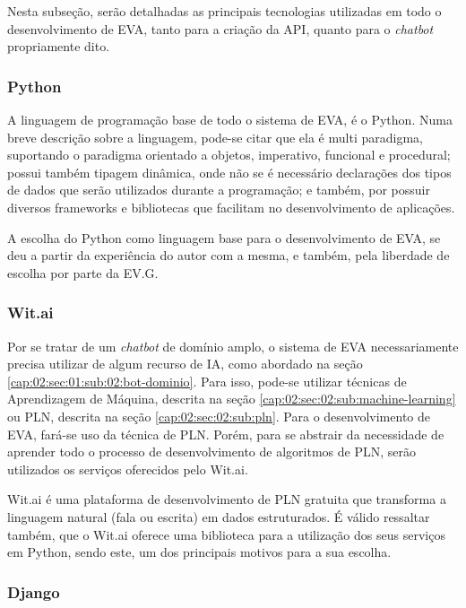 Nesta subseção, serão detalhadas as principais tecnologias utilizadas em todo o desenvolvimento de EVA, tanto para a criação da API, quanto para o \textit{chatbot} propriamente dito.

\subsubsection{Python}

A linguagem de programação base de todo o sistema de EVA, é o Python. Numa breve descrição sobre a linguagem, pode-se citar que ela é multi paradigma, suportando o paradigma orientado a objetos, imperativo, funcional e procedural; possui também tipagem dinâmica, onde não se é necessário declarações dos tipos de dados que serão utilizados durante a programação; e também, por possuir diversos frameworks e bibliotecas que facilitam no desenvolvimento de aplicações.

A escolha do Python como linguagem base para o desenvolvimento de EVA, se deu a partir da experiência do autor com a mesma, e também, pela liberdade de escolha por parte da EV.G.

\subsubsection{Wit.ai}

Por se tratar de um \textit{chatbot} de domínio amplo, o sistema de EVA necessariamente precisa utilizar de algum recurso de IA, como abordado na seção \ref{cap:02:sec:01:sub:02:bot-dominio}. Para isso, pode-se utilizar técnicas de Aprendizagem de Máquina, descrita na seção \ref{cap:02:sec:02:sub:machine-learning} ou PLN, descrita na seção \ref{cap:02:sec:02:sub:pln}.
Para o desenvolvimento de EVA, fará-se uso da técnica de PLN. Porém, para se abstrair da necessidade de aprender todo o processo de desenvolvimento de algoritmos de PLN, serão utilizados os serviços oferecidos pelo Wit.ai.

 Wit.ai é uma plataforma de desenvolvimento de PLN gratuita que transforma a linguagem natural (fala ou escrita) em dados estruturados. É válido ressaltar também, que o Wit.ai oferece uma biblioteca para a utilização dos seus serviços em Python, sendo este, um dos principais motivos para a sua escolha.

\subsubsection{Django}

